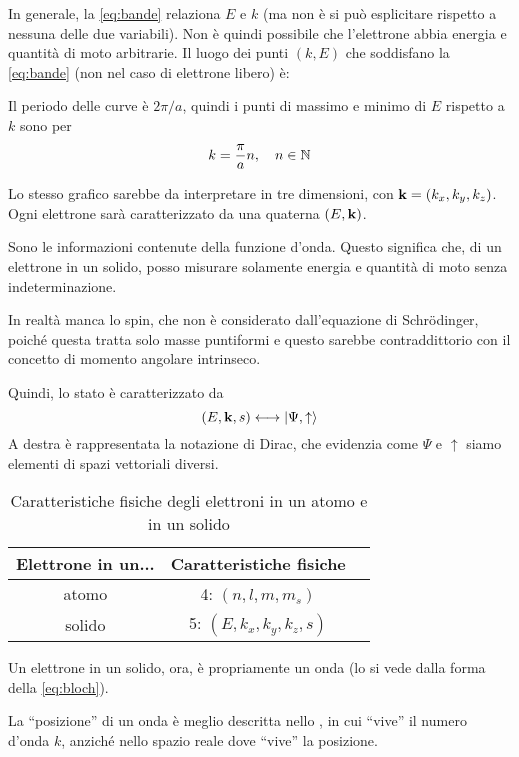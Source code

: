 In generale, la \eqref{eq:bande} relaziona $E$ e $k$ (ma non è si può esplicitare rispetto a nessuna delle due variabili).
Non è quindi possibile che l'elettrone abbia energia e quantità di moto arbitrarie.
Il luogo dei punti $(k, E)$ che soddisfano la \eqref{eq:bande} (non nel caso di elettrone libero) è:


Il periodo delle curve è $2 \pi / a$, quindi i punti di massimo e minimo di $E$ rispetto a $k$ sono per
\begin{equation}
    k = \frac{\pi}{a} n, \quad n \in \mathbb{N}
\end{equation}

Lo stesso grafico sarebbe da interpretare in tre dimensioni, con $\mathbf{k} = (k_x, k_y, k_z)$.
Ogni elettrone sarà caratterizzato da una quaterna $(E, \mathbf{k})$.

Sono le informazioni contenute della funzione d'onda.
Questo significa che, di un elettrone in un solido, posso misurare solamente energia e quantità di moto senza indeterminazione.

In realtà manca lo spin, che non è considerato dall'equazione di Schrödinger, poiché questa tratta solo masse puntiformi e questo sarebbe contraddittorio con il concetto di momento angolare intrinseco.

Quindi, lo stato è caratterizzato da
\begin{equation}
    (E, \mathbf{k}, s) \longleftrightarrow \left\lvert \Psi, \uparrow \right\rangle
\end{equation}
A destra è rappresentata la notazione di Dirac, che evidenzia come $\Psi$ e $\uparrow$ siamo elementi di spazi vettoriali diversi.
\begin{table}[!h]
    \centering
    \begin{tabular}{|c|c|c|}
        \hline
        Elettrone in un... & Caratteristiche fisiche \\
        \hline
        atomo & 4: $(n, l, m, m_s)$ \\
        solido & 5: $(E, k_x, k_y, k_z, s)$ \\
        \hline
    \end{tabular}
    \caption{Caratteristiche fisiche degli elettroni in un atomo e in un solido}
    \label{tab:caratteristiche}
\end{table}

Un elettrone in un solido, ora, è propriamente un onda (lo si vede dalla forma della \eqref{eq:bloch}).

La ``posizione'' di un onda è meglio descritta nello , in cui ``vive'' il numero d'onda $k$, anziché nello spazio reale dove  ``vive'' la posizione.

